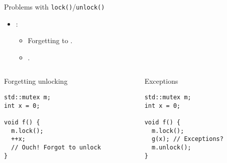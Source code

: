 \begin{frame}[t,fragile]{Problems with \texttt{lock()}/\texttt{unlock()}}
\begin{itemize}
  \item {}:
    \begin{itemize}
      \item Forgetting to .
      \item {}.
    \end{itemize}
\end{itemize}

\begin{columns}[T]
\begin{column}{.5\textwidth}
\begin{block}{Forgetting unlocking}
\begin{lstlisting}
std::mutex m;
int x = 0;

void f() {
  m.lock();
  ++x;
  // Ouch! Forgot to unlock
}
\end{lstlisting}
\end{block}
\end{column}

\begin{column}{.5\textwidth}
\begin{block}{Exceptions}
\begin{lstlisting}
std::mutex m;
int x = 0;

void f() {
  m.lock();
  g(x); // Exceptions?
  m.unlock();
}
\end{lstlisting}
\end{block}
\end{column}
\end{columns}

\end{frame}

